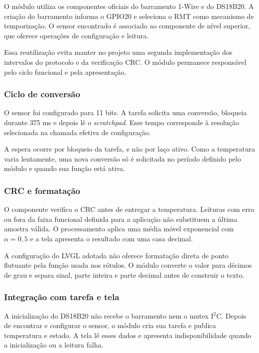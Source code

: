 \documentclass[a4paper,12pt]{article}
\begin{document}
O m\'odulo utiliza os componentes oficiais do barramento 1-Wire e do DS18B20. A cria\c{c}\~ao do barramento informa o GPIO20 e seleciona o RMT como mecanismo de temporiza\c{c}\~ao. O sensor encontrado \'e associado ao componente de n\'ivel superior, que oferece opera\c{c}\~oes de configura\c{c}\~ao e leitura.


Essa reutiliza\c{c}\~ao evita manter no projeto uma segunda implementa\c{c}\~ao dos intervalos do protocolo e da verifica\c{c}\~ao CRC. O m\'odulo permanece respons\'avel pelo ciclo funcional e pela apresenta\c{c}\~ao.


\subsubsection{Ciclo de convers\~ao}


O sensor foi configurado para 11 bits. A tarefa solicita uma convers\~ao, bloqueia durante 375 ms e depois l\^e o \emph{scratchpad}. Esse tempo corresponde \`a resolu\c{c}\~ao selecionada na chamada efetiva de configura\c{c}\~ao.


A espera ocorre por bloqueio da tarefa, e n\~ao por la\c{c}o ativo. Como a temperatura varia lentamente, uma nova convers\~ao s\'o \'e solicitada no per\'iodo definido pelo m\'odulo e quando sua fun\c{c}\~ao est\'a ativa.


\subsubsection{CRC e formata\c{c}\~ao}


O componente verifica o CRC antes de entregar a temperatura. Leituras com erro ou fora da faixa funcional definida para a aplica\c{c}\~ao n\~ao substituem a \'ultima amostra v\'alida. O processamento aplica uma m\'edia m\'ovel exponencial com $\alpha=0{,}5$ e a tela apresenta o resultado com uma casa decimal.


A configura\c{c}\~ao do LVGL adotada n\~ao oferece formata\c{c}\~ao direta de ponto flutuante pela fun\c{c}\~ao usada nos r\'otulos. O m\'odulo converte o valor para d\'ecimos de grau e separa sinal, parte inteira e parte decimal antes de construir o texto.


\subsubsection{Integra\c{c}\~ao com tarefa e tela}


A inicializa\c{c}\~ao do DS18B20 n\~ao recebe o barramento nem o mutex I$^2$C. Depois de encontrar e configurar o sensor, o m\'odulo cria sua tarefa e publica temperatura e estado. A tela l\^e esses dados e apresenta indisponibilidade quando a inicializa\c{c}\~ao ou a leitura falha.
\end{document}
